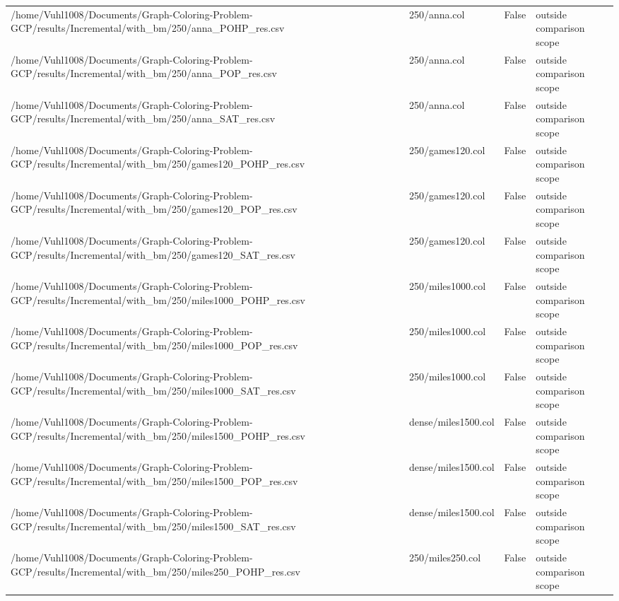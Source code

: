 \begin{table}[htbp]
\begin{tabular}{llll}
/home/Vuhl1008/Documents/Graph-Coloring-Problem-GCP/results/Incremental/with\_bm/250/anna\_POHP\_res.csv & 250/anna.col & False & outside comparison scope \\
/home/Vuhl1008/Documents/Graph-Coloring-Problem-GCP/results/Incremental/with\_bm/250/anna\_POP\_res.csv & 250/anna.col & False & outside comparison scope \\
/home/Vuhl1008/Documents/Graph-Coloring-Problem-GCP/results/Incremental/with\_bm/250/anna\_SAT\_res.csv & 250/anna.col & False & outside comparison scope \\
/home/Vuhl1008/Documents/Graph-Coloring-Problem-GCP/results/Incremental/with\_bm/250/games120\_POHP\_res.csv & 250/games120.col & False & outside comparison scope \\
/home/Vuhl1008/Documents/Graph-Coloring-Problem-GCP/results/Incremental/with\_bm/250/games120\_POP\_res.csv & 250/games120.col & False & outside comparison scope \\
/home/Vuhl1008/Documents/Graph-Coloring-Problem-GCP/results/Incremental/with\_bm/250/games120\_SAT\_res.csv & 250/games120.col & False & outside comparison scope \\
/home/Vuhl1008/Documents/Graph-Coloring-Problem-GCP/results/Incremental/with\_bm/250/miles1000\_POHP\_res.csv & 250/miles1000.col & False & outside comparison scope \\
/home/Vuhl1008/Documents/Graph-Coloring-Problem-GCP/results/Incremental/with\_bm/250/miles1000\_POP\_res.csv & 250/miles1000.col & False & outside comparison scope \\
/home/Vuhl1008/Documents/Graph-Coloring-Problem-GCP/results/Incremental/with\_bm/250/miles1000\_SAT\_res.csv & 250/miles1000.col & False & outside comparison scope \\
/home/Vuhl1008/Documents/Graph-Coloring-Problem-GCP/results/Incremental/with\_bm/250/miles1500\_POHP\_res.csv & dense/miles1500.col & False & outside comparison scope \\
/home/Vuhl1008/Documents/Graph-Coloring-Problem-GCP/results/Incremental/with\_bm/250/miles1500\_POP\_res.csv & dense/miles1500.col & False & outside comparison scope \\
/home/Vuhl1008/Documents/Graph-Coloring-Problem-GCP/results/Incremental/with\_bm/250/miles1500\_SAT\_res.csv & dense/miles1500.col & False & outside comparison scope \\
/home/Vuhl1008/Documents/Graph-Coloring-Problem-GCP/results/Incremental/with\_bm/250/miles250\_POHP\_res.csv & 250/miles250.col & False & outside comparison scope \\

\end{tabular}
\end{table}
